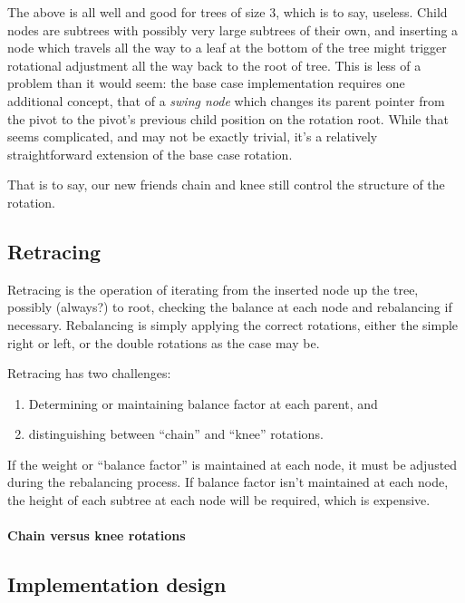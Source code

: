 \documentclass{article}
\begin{document}
The above is all well and good for trees of size 3, which is to say, useless.
Child nodes are subtrees with possibly very large subtrees of their own,
and inserting a node which travels all the way to a leaf at the bottom
of the tree might trigger rotational adjustment all the way back to the
root of tree. This is less of a problem than it would seem: the base
case implementation requires one additional concept, that of a
\textit{swing node} which changes its parent pointer from the pivot to
the pivot's previous child position on the rotation root. While that
seems complicated, and may not be exactly trivial, it's a relatively
straightforward extension of the base case rotation.

That is to say, our new friends chain and knee still control the structure
of the rotation.


\subsection{Retracing}

Retracing is the operation of iterating from the inserted
node up the tree, possibly (always?) to root, checking
the balance at each node and rebalancing if necessary.
Rebalancing is simply applying the correct rotations,
either the simple right or left, or the double rotations
as the case may be.

Retracing has two challenges:

\begin{enumerate}
  \item Determining or maintaining balance factor at each parent, and
  \item distinguishing between ``chain'' and ``knee'' rotations.
\end{enumerate}

If the weight or ``balance factor'' is maintained at each node, it must be
adjusted during the rebalancing process. If balance factor isn't maintained at
each node, the height of each subtree at each node will be required, which is
expensive.

\paragraph{Chain versus knee rotations}

\subsection{Implementation design}
\end{document}
